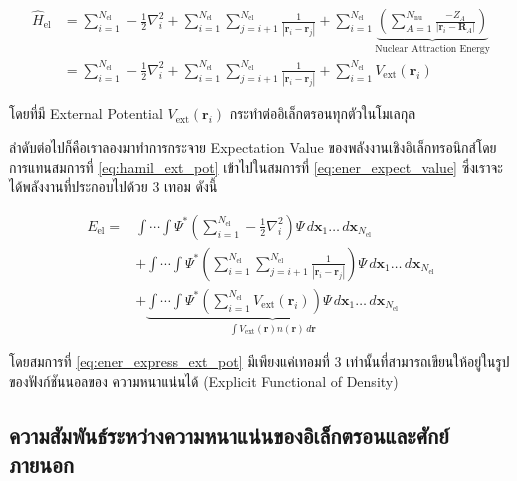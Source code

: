 \begin{align}\label{eq:hamil_ext_pot}
    \hat{H}_{\text{el}} &= \sum^{N_{\text{el}}}_{i=1} -\frac{1}{2} \nabla^{2}_{i} 
    + \sum^{N_{\text{el}}}_{i=1} \sum^{N_{\text{el}}}_{j=i+1} \frac{1}{|\bm{r}_{i}-\bm{r}_{j}|}
    + \sum^{N_{\text{el}}}_{i=1} 
    \underbrace{\left ( \sum^{N_{\text{nu}}}_{A=1} \frac{-Z_{A}}{|\bm{r}_{i}-\bm{R}_{A}|} \right )}%
    _{\text{Nuclear Attraction Energy}} \nonumber \\
    &= \sum^{N_{\text{el}}}_{i=1} -\frac{1}{2} \nabla^{2}_{i} 
    + \sum^{N_{\text{el}}}_{i=1} \sum^{N_{\text{el}}}_{j=i+1} \frac{1}{|\bm{r}_{i}-\bm{r}_{j}|}
    + \sum^{N_{\text{el}}}_{i=1} V_{\text{ext}}(\bm{r}_{i})
\end{align}

\noindent โดยที่มี External Potential $V_{\text{ext}}(\bm{r}_{i})$ กระทำต่ออิเล็กตรอนทุกตัวในโมเลกุล 

ลำดับต่อไปก็คือเราลองมาทำการกระจาย Expectation Value ของพลังงานเชิงอิเล็กทรอนิกส์โดยการแทนสมการที่ \ref{eq:hamil_ext_pot} 
เข้าไปในสมการที่ \ref{eq:ener_expect_value} ซึ่งเราจะได้พลังงานที่ประกอบไปด้วย 3 เทอม ดังนี้

\begin{align}\label{eq:ener_express_ext_pot}
    E_{\text{el}} =& \int \cdots \int \Psi^{\ast} 
    \left ( \sum^{N_{\text{el}}}_{i=1} -\frac{1}{2} \nabla^{2}_{i} \right ) 
    \Psi \, d\bm{x}_{1} \dots \, d\bm{x}_{N_{\text{el}}} \nonumber \\
    &+ \int \cdots \int \Psi^{\ast} 
    \left ( \sum^{N_{\text{el}}}_{i=1} \sum^{N_{\text{el}}}_{j=i+1} \frac{1}{|\bm{r}_{i}-\bm{r}_{j}|} \right ) 
    \Psi \, d\bm{x}_{1} \dots \, d\bm{x}_{N_{\text{el}}} \nonumber \\
    &+ \underbrace{\int \cdots \int \Psi^{\ast} 
    \left ( \sum^{N_{\text{el}}}_{i=1} V_{\text{ext}}(\bm{r}_{i}) \right ) 
    \Psi \, d\bm{x}_{1} \dots \, d\bm{x}_{N_{\text{el}}}%
    }_{\textstyle \int V_{\text{ext}}(\bm{r}) n(\bm{r}) \, d\bm{r}}
\end{align}

\noindent โดยสมการที่ \ref{eq:ener_express_ext_pot} มีเพียงแค่เทอมที่ 3 เท่านั้นที่สามารถเขียนให้อยู่ในรูปของฟังก์ชันนอลของ%
ความหนาแน่นได้ (Explicit Functional of Density)

\subsection{ความสัมพันธ์ระหว่างความหนาแน่นของอิเล็กตรอนและศักย์ภายนอก}
\label{ssec:ener_density_ext_pot}

